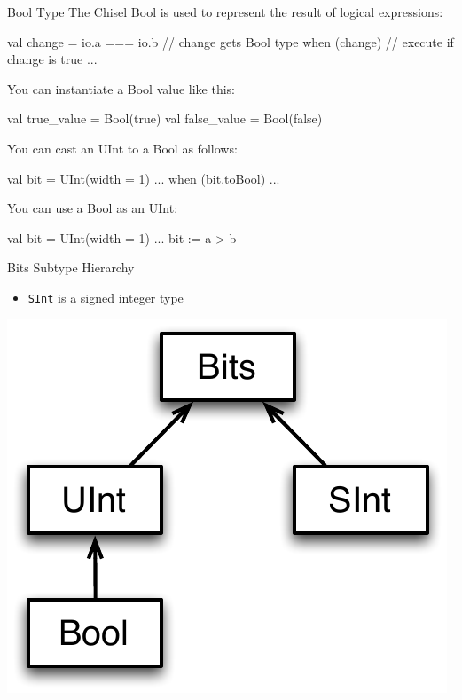 \documentclass[xcolor=pdflatex,dvipsnames,table]{beamer}
\begin{document}
\begin{frame}[fragile]{Bool Type}
The Chisel Bool is used to represent the result of logical expressions:
\begin{scala}
val change = io.a === io.b // change gets Bool type
when (change) { // execute if change is true
 ...
} 
\end{scala}

You can instantiate a Bool value like this:
\begin{scala}
val true_value  = Bool(true)
val false_value = Bool(false)
\end{scala}

You can cast an UInt to a Bool as follows:
\begin{scala}
val bit = UInt(width = 1) ...
when (bit.toBool) { ... }
\end{scala}

You can use a Bool as an UInt:
\begin{scala}
val bit = UInt(width = 1) ...
bit := a > b
\end{scala}

\end{frame}

\begin{frame}[fragile]{Bits Subtype Hierarchy}
\begin{itemize}
\item \verb+SInt+ is a signed integer type
\end{itemize}
\begin{center}
\includegraphics[height=0.7\textheight]{figs/bits-hierarchy.pdf}
\end{center}
\end{frame}
\end{document}
